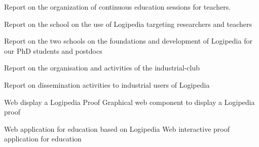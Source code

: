 \begin{workpackage}[id=dissemination,type=MGT,
  short={Dissemination},
  title={Dissemination, communication and exploitation},
  lead=Inr,InrRM=12,BirRM=4,IrtRM=4,ImtRM=2,StrRM=2,ZibRM=14,EduRM=12]
\begin{wpdelivs}

  \begin{wpdeliv}[due=18,miles=???,id=continuoused,dissem=PU,nature=R,lead=Str]{
 Report on the organization of continuous education sessions for teachers.}
  \end{wpdeliv}

  \begin{wpdeliv}[due=48,miles=???,id=school-researchers,dissem=PU,nature=R,lead=Bir]{Report on the school on the use of Logipedia targeting researchers and teachers}
  \end{wpdeliv}


  \begin{wpdeliv}[due=24,miles=???,id=school-second-phd,dissem=PU,nature=R,lead=Bir]{Report on the two schools on the foundations and development of Logipedia for our PhD students and postdocs}
  \end{wpdeliv}


  \begin{wpdeliv}[due=24,miles=???,id=school-second-certif,dissem=PU,nature=R,lead=Irt]{Report on the organisation and activities of the industrial-club}
  \end{wpdeliv}

  \begin{wpdeliv}[due=48,miles=???,id=school-second-certif,dissem=PU,nature=R,lead=Irt]{Report on dissemination activities to industrial users of Logipedia}
  \end{wpdeliv}


  \begin{wpdeliv}[due=36,miles=???,id=edu-display,dissem=PU,nature=D,lead=Edu]{Web display a Logipedia Proof}
    Graphical web component to display a Logipedia proof
  \end{wpdeliv}

  \begin{wpdeliv}[due=36,miles=???,id=edu-app,dissem=PU,nature=OTHER,lead=Edu]{Web application for education based on Logipedia}
    Web interactive proof application for education
  \end{wpdeliv}

\end{wpdelivs}

\end{workpackage}


